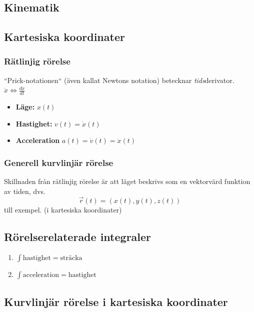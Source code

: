 \documentclass{article}
\newenvironment{ankiflashcard}[1]{}{}
\newcommand{\midtitle}[1]{
\begin{center}
\Huge{\text{#1}}
\newpage
\end{center}
}
\begin{document}
\newpage
\midtitle{Dynamik}
\newpage
\begin{paracol}{2}
\section{Kinematik}
\subsection{Kartesiska koordinater}
\subsubsection{Rätlinjig rörelse}
``Prick-notationen`` (även kallat Newtons notation) betecknar \textit{tids}derivator. $\dot x \iff \frac{dx}{dt}$
\begin{itemize}
    \item \textbf{Läge:} $x(t)$
    \item \textbf{Hastighet:} $v(t)= \dot x(t)$
    \item \textbf{Acceleration} $a(t)=\dot v(t) = \ddot x(t)$
\end{itemize}
\subsubsection{Generell kurvlinjär rörelse}
Skillnaden från rätlinjig rörelse är att läget beskrivs som en vektorvärd funktion av tiden, dvs. $$\vec r(t)=(x(t),y(t),z(t))$$ till exempel. (i kartesiska koordinater)

\begin{ankiflashcard}{Hur kan man gå från t.ex. hastighet till att få sträckan med hjälp av differentialer?}
    
\subsection{Rörelserelaterade integraler}
\begin{enumerate}
    \item $\int \text{hastighet} = \text{sträcka}$
    \item $\int \text{acceleration} = \text{hastighet}$
\end{enumerate}
\end{ankiflashcard}

\subsection{Kurvlinjär rörelse i kartesiska koordinater}

\end{paracol}
\end{document}
